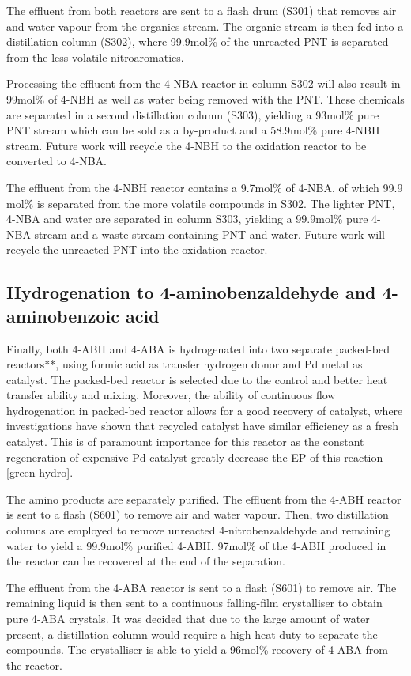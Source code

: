 The effluent from both reactors are sent to a flash drum (S301) that removes air and water vapour from the organics stream. The organic stream is then fed into a distillation column (S302), where 99.9mol\% of the unreacted PNT is separated from the less volatile nitroaromatics. 

Processing the effluent from the 4-NBA reactor in column S302 will also result in 99mol\% of 4-NBH as well as water being removed with the PNT. These chemicals are separated in a second distillation column (S303), yielding a 93mol\% pure PNT stream which can be sold as a by-product and a 58.9mol\% pure 4-NBH stream. Future work will recycle the 4-NBH to the oxidation reactor to be converted to 4-NBA.

The effluent from the 4-NBH reactor contains a 9.7mol\% of 4-NBA, of which 99.9 mol\% is separated from the more volatile compounds in S302. The lighter PNT,  4-NBA and water are separated in column S303, yielding a 99.9mol\% pure 4-NBA stream and a waste stream containing PNT and water. Future work will recycle the unreacted PNT into the oxidation reactor.

\subsection{Hydrogenation to 4-aminobenzaldehyde and 4-aminobenzoic acid}

Finally, both 4-ABH and 4-ABA is hydrogenated into two separate packed-bed reactors**, using formic acid as transfer hydrogen donor and Pd metal as catalyst. The packed-bed reactor is selected due to the control and better heat transfer ability and mixing. Moreover, the ability of continuous flow hydrogenation in packed-bed reactor allows for a good recovery of catalyst, where investigations have shown that recycled catalyst have similar efficiency as a fresh catalyst. This is of paramount importance for this reactor as the constant regeneration of expensive Pd catalyst greatly decrease the EP of this reaction [green hydro]. 

The amino products are separately purified. The effluent from the 4-ABH reactor is sent to a flash (S601) to remove air and water vapour.  Then, two distillation columns are employed to remove unreacted 4-nitrobenzaldehyde and remaining water to yield a 99.9mol\% purified 4-ABH. 97mol\% of the 4-ABH produced in the reactor can be recovered at the end of the separation.

The effluent from the 4-ABA reactor is sent to a flash (S601) to remove air. The remaining liquid is then sent to a continuous falling-film crystalliser to obtain pure 4-ABA crystals. It was decided that due to the large amount of water present, a distillation column would require a high heat duty to separate the compounds. The crystalliser is able to yield a 96mol\% recovery of 4-ABA from the reactor.

